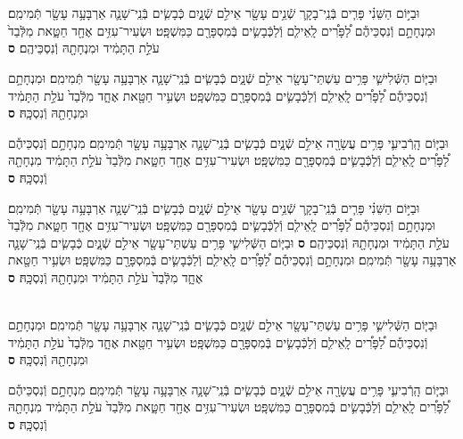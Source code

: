 \documentclass[twoside, openany, parskip=half, 11pt]{book}
\begin{document}
\begin{footnotesize}
\begin{multicols}{2}

\\
\\
וּבַיּ֣וֹם הַשֵּׁנִ֗י פָּרִ֧ים בְּֿנֵֽי־בָקָ֛ר שְֿׁנֵ֥ים עָשָׂ֖ר אֵילִ֣ם שְֿׁנָ֑יִם כְּֿבָשִׂ֧ים בְּֿנֵֽי־שָׁנָ֛ה אַרְבָּעָ֥ה עָשָׂ֖ר תְּֿמִימִֽם׃ וּמִנְחָתָ֣ם וְֿנִסְכֵּיהֶ֡ם לַ֠פָּרִ֠ים לָֽאֵילִ֧ם וְֿלַכְּֿבָשִׂ֛ים בְּֿמִסְפָּרָ֖ם כַּמִּשְׁפָּֽט׃ וּשְׂעִיר־עִזִּ֥ים אֶחָ֖ד חַטָּ֑את מִלְּֿבַד֙ עֹלַ֣ת הַתָּמִ֔יד וּמִנְחָתָ֖הּ וְֿנִסְכֵּיהֶֽם׃ \textbf{ס}

וּבַיּ֧וֹם הַשְּֿׁלִישִׁ֛י פָּרִ֥ים עַשְׁתֵּי־עָשָׂ֖ר אֵילִ֣ם שְֿׁנָ֑יִם כְּֿבָשִׂ֧ים בְּֿנֵֽי־שָׁנָ֛ה אַרְבָּעָ֥ה עָשָׂ֖ר תְּֿמִימִֽם׃ וּמִנְחָתָ֣ם וְֿנִסְכֵּיהֶ֡ם לַ֠פָּרִ֠ים לָֽאֵילִ֧ם וְֿלַכְּֿבָשִׂ֛ים בְּֿמִסְפָּרָ֖ם כַּמִּשְׁפָּֽט׃ וּשְׂעִ֥יר חַטָּ֖את אֶחָ֑ד מִלְּֿבַד֙ עֹלַ֣ת הַתָּמִ֔יד וּמִנְחָתָ֖הּ וְֿנִסְכָּֽהּ׃ \textbf{ס}

וּבַיּ֧וֹם הָֽרְֿבִיעִ֛י פָּרִ֥ים עֲשָׂרָ֖ה אֵילִ֣ם שְֿׁנָ֑יִם כְּֿבָשִׂ֧ים בְּֿנֵֽי־שָׁנָ֛ה אַרְבָּעָ֥ה עָשָׂ֖ר תְּֿמִימִֽם׃ מִנְחָתָ֣ם וְֿנִסְכֵּיהֶ֡ם לַ֠פָּרִ֠ים לָֽאֵילִ֧ם וְֿלַכְּֿבָשִׂ֛ים בְּֿמִסְפָּרָ֖ם כַּמִּשְׁפָּֽט׃ וּשְׂעִיר־עִזִּ֥ים אֶחָ֖ד חַטָּ֑את מִלְּֿבַד֙ עֹלַ֣ת הַתָּמִ֔יד מִנְחָתָ֖הּ וְֿנִסְכָּֽהּ׃ \textbf{ס}

וּבַיּ֣וֹם הַשֵּׁנִ֗י פָּרִ֧ים בְּֿנֵֽי־בָקָ֛ר שְֿׁנֵ֥ים עָשָׂ֖ר אֵילִ֣ם שְֿׁנָ֑יִם כְּֿבָשִׂ֧ים בְּֿנֵֽי־שָׁנָ֛ה אַרְבָּעָ֥ה עָשָׂ֖ר תְּֿמִימִֽם׃ וּמִנְחָתָ֣ם וְֿנִסְכֵּיהֶ֡ם לַ֠פָּרִ֠ים לָֽאֵילִ֧ם וְֿלַכְּֿבָשִׂ֛ים בְּֿמִסְפָּרָ֖ם כַּמִּשְׁפָּֽט׃ וּשְׂעִיר־עִזִּ֥ים אֶחָ֖ד חַטָּ֑את מִלְּֿבַד֙ עֹלַ֣ת הַתָּמִ֔יד וּמִנְחָתָ֖הּ וְֿנִסְכֵּיהֶֽם׃ \textbf{ס}
וּבַיּ֧וֹם הַשְּֿׁלִישִׁ֛י פָּרִ֥ים עַשְׁתֵּי־עָשָׂ֖ר אֵילִ֣ם שְֿׁנָ֑יִם כְּֿבָשִׂ֧ים בְּֿנֵֽי־שָׁנָ֛ה אַרְבָּעָ֥ה עָשָׂ֖ר תְּֿמִימִֽם׃ וּמִנְחָתָ֣ם וְֿנִסְכֵּיהֶ֡ם לַ֠פָּרִ֠ים לָֽאֵילִ֧ם וְֿלַכְּֿבָשִׂ֛ים בְּֿמִסְפָּרָ֖ם כַּמִּשְׁפָּֽט׃ וּשְׂעִ֥יר חַטָּ֖את אֶחָ֑ד מִלְּֿבַד֙ עֹלַ֣ת הַתָּמִ֔יד וּמִנְחָתָ֖הּ וְֿנִסְכָּֽהּ׃ \textbf{ס}

\\
וּבַיּ֧וֹם הַשְּֿׁלִישִׁ֛י פָּרִ֥ים עַשְׁתֵּי־עָשָׂ֖ר אֵילִ֣ם שְֿׁנָ֑יִם כְּֿבָשִׂ֧ים בְּֿנֵֽי־שָׁנָ֛ה אַרְבָּעָ֥ה עָשָׂ֖ר תְּֿמִימִֽם׃ וּמִנְחָתָ֣ם וְֿנִסְכֵּיהֶ֡ם לַ֠פָּרִ֠ים לָֽאֵילִ֧ם וְֿלַכְּֿבָשִׂ֛ים בְּֿמִסְפָּרָ֖ם כַּמִּשְׁפָּֽט׃ וּשְׂעִ֥יר חַטָּ֖את אֶחָ֑ד מִלְּֿבַד֙ עֹלַ֣ת הַתָּמִ֔יד וּמִנְחָתָ֖הּ וְֿנִסְכָּֽהּ׃ \textbf{ס}

וּבַיּ֧וֹם הָֽרְֿבִיעִ֛י פָּרִ֥ים עֲשָׂרָ֖ה אֵילִ֣ם שְֿׁנָ֑יִם כְּֿבָשִׂ֧ים בְּֿנֵֽי־שָׁנָ֛ה אַרְבָּעָ֥ה עָשָׂ֖ר תְּֿמִימִֽם׃ מִנְחָתָ֣ם וְֿנִסְכֵּיהֶ֡ם לַ֠פָּרִ֠ים לָֽאֵילִ֧ם וְֿלַכְּֿבָשִׂ֛ים בְּֿמִסְפָּרָ֖ם כַּמִּשְׁפָּֽט׃ וּשְׂעִיר־עִזִּ֥ים אֶחָ֖ד חַטָּ֑את מִלְּֿבַד֙ עֹלַ֣ת הַתָּמִ֔יד מִנְחָתָ֖הּ וְֿנִסְכָּֽהּ׃ \textbf{ס}


\end{multicols}
\end{footnotesize}
\end{document}
